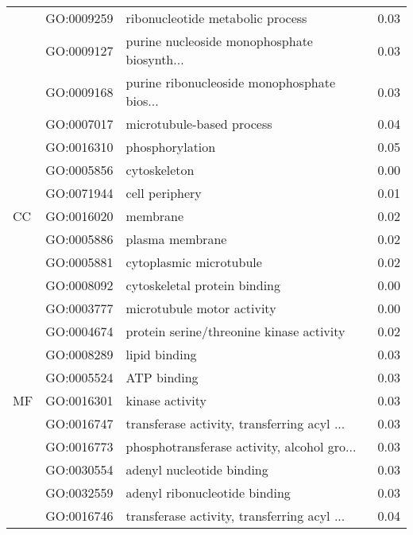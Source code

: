 \begin{longtable}{lllr}
   & GO:0009259 &             ribonucleotide metabolic process &          0.03 \\
   & GO:0009127 &  purine nucleoside monophosphate biosynth... &          0.03 \\
   & GO:0009168 &  purine ribonucleoside monophosphate bios... &          0.03 \\
   & GO:0007017 &                    microtubule-based process &          0.04 \\
   & GO:0016310 &                              phosphorylation &          0.05 \\
\cline{1-4}
\multirow{5}{*}{CC} & GO:0005856 &                                 cytoskeleton &          0.00 \\
   & GO:0071944 &                               cell periphery &          0.01 \\
   & GO:0016020 &                                     membrane &          0.02 \\
   & GO:0005886 &                              plasma membrane &          0.02 \\
   & GO:0005881 &                      cytoplasmic microtubule &          0.02 \\
\cline{1-4}
\multirow{11}{*}{MF} & GO:0008092 &                 cytoskeletal protein binding &          0.00 \\
   & GO:0003777 &                   microtubule motor activity &          0.00 \\
   & GO:0004674 &     protein serine/threonine kinase activity &          0.02 \\
   & GO:0008289 &                                lipid binding &          0.03 \\
   & GO:0005524 &                                  ATP binding &          0.03 \\
   & GO:0016301 &                              kinase activity &          0.03 \\
   & GO:0016747 &  transferase activity, transferring acyl ... &          0.03 \\
   & GO:0016773 &  phosphotransferase activity, alcohol gro... &          0.03 \\
   & GO:0030554 &                    adenyl nucleotide binding &          0.03 \\
   & GO:0032559 &                adenyl ribonucleotide binding &          0.03 \\
   & GO:0016746 &  transferase activity, transferring acyl ... &          0.04 \\
\end{longtable}
